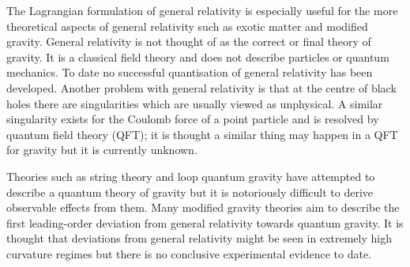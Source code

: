 The Lagrangian formulation of general relativity is especially useful for the more theoretical aspects of general relativity such as exotic matter and modified gravity. General relativity is not thought of as the correct or final theory of gravity. It is a classical field theory and does not describe particles or quantum mechanics. To date no successful quantisation of general relativity has been developed. Another problem with general relativity is that at the centre of black holes there are singularities which are usually viewed as unphysical. A similar singularity exists for the Coulomb force of a point particle and is resolved by quantum field theory (QFT); it is thought a similar thing may happen in a QFT for gravity but it is currently unknown.

Theories such as string theory and loop quantum gravity have attempted to describe a quantum theory of gravity but it is notoriously difficult to derive observable effects from them. Many modified gravity theories aim to describe the first leading-order deviation from general relativity towards quantum gravity. It is thought that deviations from general relativity might be seen in extremely high curvature regimes but there is no conclusive experimental evidence to date.





